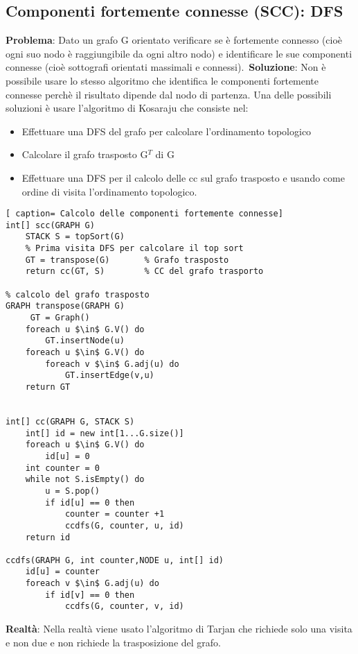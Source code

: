 \documentclass[../cheatSheetAlgoritmi.tex]{subfiles}
\begin{document}
\subsection{Componenti fortemente connesse (SCC): DFS}
\textbf{Problema}: Dato un grafo G orientato verificare se è fortemente connesso (cioè  ogni suo nodo è raggiungibile da ogni altro nodo) e identificare le sue componenti connesse (cioè sottografi orientati massimali e connessi).\
\textbf{Soluzione}: Non è possibile usare lo stesso algoritmo che identifica le componenti fortemente connesse perchè il risultato dipende dal nodo di partenza. Una delle possibili soluzioni è usare l'algoritmo di Kosaraju che consiste nel:
\begin{itemize}
	\item Effettuare una DFS del grafo per calcolare l'ordinamento topologico
	\item Calcolare il grafo trasposto G$^{T}$ di G
	\item Effettuare una DFS per il calcolo delle cc sul grafo trasposto e usando come ordine di visita l'ordinamento topologico. 
\end{itemize} 
\newpage
\begin{lstlisting}[ caption= Calcolo delle componenti fortemente connesse]
int[] scc(GRAPH G)
	STACK S = topSort(G) 	
	% Prima visita DFS per calcolare il top sort
	GT = transpose(G)		% Grafo trasposto
	return cc(GT, S)		% CC del grafo trasporto
	
% calcolo del grafo trasposto
GRAPH transpose(GRAPH G)
	 GT = Graph()
	foreach u $\in$ G.V() do
		GT.insertNode(u)
	foreach u $\in$ G.V() do
		foreach v $\in$ G.adj(u) do
			GT.insertEdge(v,u)
	return GT


int[] cc(GRAPH G, STACK S)
	int[] id = new int[1...G.size()]
	foreach u $\in$ G.V() do
		id[u] = 0
	int counter = 0
	while not S.isEmpty() do
		u = S.pop()
		if id[u] == 0 then
			counter = counter +1
			ccdfs(G, counter, u, id)
	return id
	
ccdfs(GRAPH G, int counter,NODE u, int[] id)
	id[u] = counter
	foreach v $\in$ G.adj(u) do
		if id[v] == 0 then
			ccdfs(G, counter, v, id)
\end{lstlisting}

\textbf{Realtà}: Nella realtà viene usato l'algoritmo di Tarjan che richiede solo una visita e non due e non richiede la trasposizione del grafo.

\newpage
\end{document}
